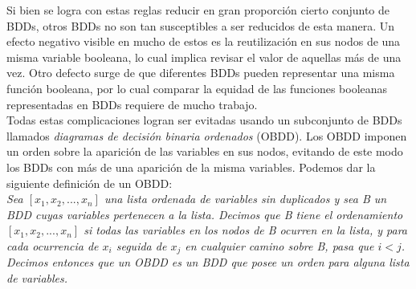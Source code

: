 \documentclass[titlepage, 12pt]{book}
\begin{document}
Si bien se logra con estas reglas reducir en gran proporci\'on cierto conjunto de BDDs, otros BDDs no son tan susceptibles a ser reducidos de esta manera. Un efecto negativo visible en mucho de estos es la reutilizaci\'on en sus nodos de una misma variable booleana, lo cual implica revisar el valor de aquellas m\'as de una vez. Otro defecto surge de que diferentes BDDs pueden representar una misma funci\'on booleana, por lo cual comparar la equidad de las funciones booleanas representadas en BDDs requiere de mucho trabajo.\\

Todas estas complicaciones logran ser evitadas usando un subconjunto de BDDs llamados \textit{diagramas de decisi\'on binaria ordenados} (OBDD). Los OBDD imponen un orden sobre la aparici\'on de las variables en sus nodos, evitando de este modo los BDDs con m\'as de una aparici\'on de la misma variables. Podemos dar la siguiente definici\'on de un OBDD\cite{Huth}:\\

\textit{Sea $[x_1,x_2,...,x_n]$ una lista ordenada de variables sin duplicados y sea B un BDD cuyas variables pertenecen a la lista. Decimos que B tiene el ordenamiento $[x_1,x_2,...,x_n]$ si todas las variables en los nodos de B ocurren en la lista, y para cada ocurrencia de $x_i$ seguida de $x_j$ en cualquier camino sobre B, pasa que $i < j$. Decimos entonces que un OBDD es un BDD que posee un orden para alguna lista de variables.}\\
\end{document}
